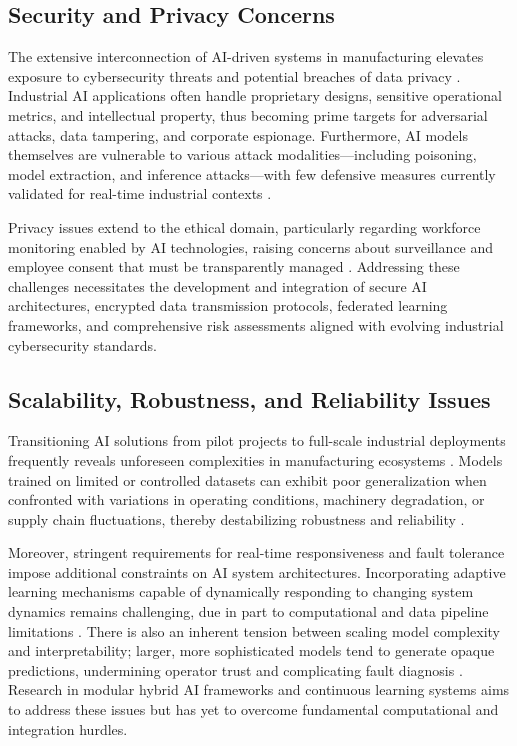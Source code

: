 \documentclass[11pt]{article}
\begin{document}
\subsection{Security and Privacy Concerns}

The extensive interconnection of AI-driven systems in manufacturing elevates exposure to cybersecurity threats and potential breaches of data privacy \cite{ref13,ref37}. Industrial AI applications often handle proprietary designs, sensitive operational metrics, and intellectual property, thus becoming prime targets for adversarial attacks, data tampering, and corporate espionage. Furthermore, AI models themselves are vulnerable to various attack modalities—including poisoning, model extraction, and inference attacks—with few defensive measures currently validated for real-time industrial contexts \cite{ref37,ref41}.

Privacy issues extend to the ethical domain, particularly regarding workforce monitoring enabled by AI technologies, raising concerns about surveillance and employee consent that must be transparently managed \cite{ref2}. Addressing these challenges necessitates the development and integration of secure AI architectures, encrypted data transmission protocols, federated learning frameworks, and comprehensive risk assessments aligned with evolving industrial cybersecurity standards.

\subsection{Scalability, Robustness, and Reliability Issues}

Transitioning AI solutions from pilot projects to full-scale industrial deployments frequently reveals unforeseen complexities in manufacturing ecosystems \cite{ref16,ref19}. Models trained on limited or controlled datasets can exhibit poor generalization when confronted with variations in operating conditions, machinery degradation, or supply chain fluctuations, thereby destabilizing robustness and reliability \cite{ref6,ref20}.

Moreover, stringent requirements for real-time responsiveness and fault tolerance impose additional constraints on AI system architectures. Incorporating adaptive learning mechanisms capable of dynamically responding to changing system dynamics remains challenging, due in part to computational and data pipeline limitations \cite{ref31,ref32}. There is also an inherent tension between scaling model complexity and interpretability; larger, more sophisticated models tend to generate opaque predictions, undermining operator trust and complicating fault diagnosis \cite{ref2}. Research in modular hybrid AI frameworks and continuous learning systems aims to address these issues but has yet to overcome fundamental computational and integration hurdles.
\end{document}
